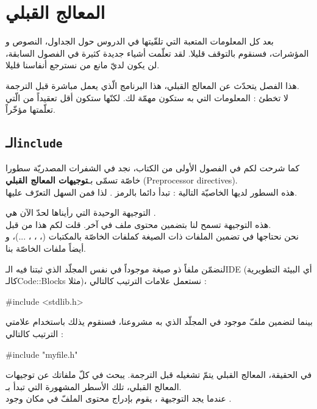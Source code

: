 \chapter{المعالج القبلي}
بعد كل المعلومات المتعبة التي تلقّيتها في الدروس حول الجداول، النصوص و المؤشرات، فسنقوم بالتوقف قليلا. لقد تعلّمت أشياء جديدة كثيرة في الفصول السابقة، لن يكون لديّ مانع من نسترجع أنفاسنا قليلا.

هذا الفصل يتحدّث عن المعالج القبلي، هذا البرنامج الّذي يعمل مباشرة قبل الترجمة.\\
لا تخطئ : المعلومات التي به ستكون مهمّة لك. لكنّها ستكون أقل تعقيداً من الّتي تعلّمتها مؤخّراً.

\section{الـ\texttt{include}}
كما شرحت لكم في الفصول الأولى من الكتاب، نجد في الشفرات المصدريّة سطورا خاصّة تسمّى بـ\textbf{توجيهات المعالج القبلي} (\textenglish{Preprocessor directives}).\\
هذه السطور لديها الخاصيّة التالية : تبدأ دائما بالرمز
\InlineCode{\#}.
لذا فمن السهل التعرّف عليها.

التوجيهة الوحيدة التي رأيناها لحدّ الآن هي
.\\
هذه التوجيهة تسمح لنا بتضمين محتوى ملف في آخر. قلت لكم هذا من قبل.\\
نحن نحتاجها في تضمين الملفات ذات الصيغة
كملفات
الخاصّة بالمكتبات
(، ، ، ...)،
و أيضاً ملفات
الخاصّة بنا.

لنضمّن ملفاً ذو صيغة
موجوداً في نفس المجلّد الذي ثبتنا فيه الـ\textenglish{IDE}
(أي البيئة التطويرية كالـ\textenglish{Code::Blocks}
مثلا)، نستعمل علامات الترتيب
\InlineCode{< >}
كالتالي :
\begin{Csource}
#include <stdlib.h>
\end{Csource}
بينما لتضمين ملفّ
موجود في المجلّد الذي به مشروعنا، فسنقوم يذلك باستخدام علامتي الترتيب كالتالي :
\begin{Csource}
#include "myfile.h"
\end{Csource}
في الحقيقة، المعالج القبلي يتمّ تشغيله قبل الترجمة. يبحث في كلّ ملفاتك عن توجيهات المعالج القبلي، تلك الأسطر المشهورة التي تبدأ بـ\InlineCode{\#}.\\
عندما يجد التوجيهة
،
يقوم بإدراج محتوى الملفّ في مكان وجود
.


